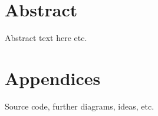 



\chapter*{Abstract}
Abstract text here etc.

\tableofcontents

\listoffigures
\listoftables



\mainmatter 








\chapter*{Appendices}
Source code, further diagrams, ideas, etc.

\backmatter

\def\baselinestretch{1.24}\normalfont






